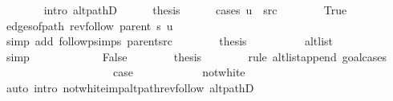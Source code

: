\begin{isabellebody}
\ \ \ \ \ \ \isamarkupfalse%
\ {\isacharparenleft}{\kern0pt}intro\ alt{\isacharunderscore}{\kern0pt}pathD{\isacharparenleft}{\kern0pt}{}{\isacharparenright}{\kern0pt}{\isacharparenright}{\kern0pt}\isanewline
\ \ \ \ \isamarkupfalse%
\ {\isacharquery}{\kern0pt}thesis\isanewline
\ \ \ \ \isamarkupfalse%
\ {\isacharparenleft}{\kern0pt}cases\ {\isachardoublequoteopen}u\ {\isacharequal}{\kern0pt}\ src{\isachardoublequoteclose}{\isacharparenright}{\kern0pt}\isanewline
\ \ \ \ \ \ \isamarkupfalse%
\ True\isanewline
\ \ \ \ \ \ \isamarkupfalse%
\ {\isachardoublequoteopen}edges{\isacharunderscore}{\kern0pt}of{\isacharunderscore}{\kern0pt}path\ {\isacharparenleft}{\kern0pt}rev{\isacharunderscore}{\kern0pt}follow\ {\isacharparenleft}{\kern0pt}parent\ s{\isacharparenright}{\kern0pt}\ u{\isacharparenright}{\kern0pt}\ {\isacharequal}{\kern0pt}\ {\isacharbrackleft}{\kern0pt}{\isacharbrackright}{\kern0pt}{\isachardoublequoteclose}\isanewline
\ \ \ \ \ \ \ \ \isamarkupfalse%
\ {\isacharparenleft}{\kern0pt}simp\ add{\isacharcolon}{\kern0pt}\ follow{\isacharunderscore}{\kern0pt}psimps\ parent{\isacharunderscore}{\kern0pt}src{\isacharparenright}{\kern0pt}\isanewline
\ \ \ \ \ \ \isamarkupfalse%
\ {\isacharquery}{\kern0pt}thesis\isanewline
\ \ \ \ \ \ \ \ \isamarkupfalse%
\ alt{\isacharunderscore}{\kern0pt}list\isanewline
\ \ \ \ \ \ \ \ \isamarkupfalse%
\ simp\isanewline
\ \ \ \ \isamarkupfalse%
\isanewline
\ \ \ \ \ \ \isamarkupfalse%
\ False\isanewline
\ \ \ \ \ \ \isamarkupfalse%
\ {\isacharquery}{\kern0pt}thesis\isanewline
\ \ \ \ \ \ \isamarkupfalse%
\ {\isacharparenleft}{\kern0pt}rule\ alt{\isacharunderscore}{\kern0pt}list{\isacharunderscore}{\kern0pt}append{\isacharunderscore}{\kern0pt}{}{\isacharprime}{\kern0pt}{\isacharcomma}{\kern0pt}\ goal{\isacharunderscore}{\kern0pt}cases{\isacharparenright}{\kern0pt}\isanewline
\ \ \ \ \ \ \ \ \isamarkupfalse%
\ {}\isanewline
\ \ \ \ \ \ \ \ \isamarkupfalse%
\ {\isacharquery}{\kern0pt}case\isanewline
\ \ \ \ \ \ \ \ \ \ \isamarkupfalse%
\ not{\isacharunderscore}{\kern0pt}white\isanewline
\ \ \ \ \ \ \ \ \ \ \isamarkupfalse%
\ {\isacharparenleft}{\kern0pt}auto\ intro{\isacharcolon}{\kern0pt}\ not{\isacharunderscore}{\kern0pt}white{\isacharunderscore}{\kern0pt}imp{\isacharunderscore}{\kern0pt}alt{\isacharunderscore}{\kern0pt}path{\isacharunderscore}{\kern0pt}rev{\isacharunderscore}{\kern0pt}follow\ alt{\isacharunderscore}{\kern0pt}pathD{\isacharparenleft}{\kern0pt}{}{\isacharparenright}{\kern0pt}{\isacharparenright}{\kern0pt}\isanewline

\end{isabellebody}
